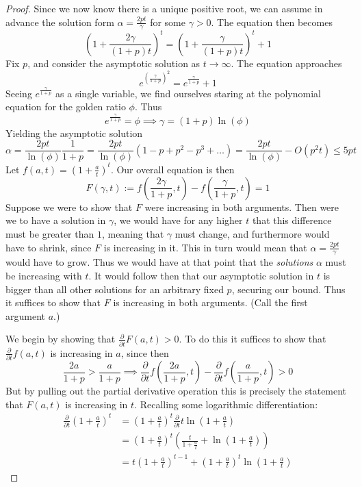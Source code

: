 \begin{proof}
Since we now know there is a unique positive root, we can assume in advance the solution form $\alpha = \frac{2pt}{\gamma}$ for some $\gamma > 0$. The equation then becomes 
\[ \left( 1+\frac{2\gamma}{(1+p)t} \right)^t = \left( 1+\frac{\gamma}{(1+p)t} \right)^t+1 \] 
Fix $p$, and consider the asymptotic solution as $t \to \infty$. The equation approaches
\[ e^{(\frac{\gamma}{1+p})^2} = e^{\frac{\gamma}{1+p}} + 1 \] 
Seeing $e^{\frac{\gamma}{1+p}}$ as a single variable, we find ourselves staring at the polynomial equation for the golden ratio $\phi$. Thus 
\[ e^{\frac{\gamma}{1+p}} = \phi \implies \gamma = (1+p)\ln(\phi) \]
Yielding the asymptotic solution
\[ \alpha = \frac{2pt}{\ln(\phi)}\frac{1}{1+p} = \frac{2pt}{\ln(\phi)}(1-p+p^2-p^3 + \ldots) = \frac{2pt}{\ln(\phi)} - O(p^2t) \leq 5pt \]
 Let $f(a,t) = \left( 1+\frac{a}{t} \right)^t$. Our overall equation is then
 \[ F(\gamma,t) := f(\frac{2\gamma}{1+p},t) - f(\frac{\gamma}{1+p},t) = 1 \]
Suppose we were to show that $F$ were increasing in both arguments. Then were we to have a solution in $\gamma$, we would have for any higher $t$ that this difference must be greater than $1$, meaning that $\gamma$ must change, and furthermore would have to shrink, since $F$ is increasing in it. This in turn would mean that $\alpha = \frac{2pt}{\gamma}$ would have to grow. Thus we would have at that point that the \emph{solutions} $\alpha$ must be increasing with $t$. It would follow then that our asymptotic solution in $t$ is bigger than all other solutions for an arbitrary fixed $p$, securing our bound. Thus it suffices to show that $F$ is increasing in both arguments. (Call the first argument $a$.) \par 
We begin by showing that $\frac{\partial}{\partial t}F(a,t) > 0$. To do this it suffices to show that $\frac{\partial}{\partial t} f(a,t)$ is increasing in $a$, since then 
\[ \frac{2a}{1+p} > \frac{a}{1+p} \implies \frac{\partial}{\partial t}f(\frac{2a}{1+p},t) - \frac{\partial}{\partial t}f(\frac{a}{1+p},t) > 0 \]
But by pulling out the partial derivative operation this is precisely the statement that $F(a,t)$ is increasing in $t$. Recalling some logarithmic differentiation:
\begin{align*}
	\frac{\partial}{\partial t}(1+\frac{a}{t})^t &= (1+\frac{a}{t})^t\frac{\partial}{\partial t}t\ln(1+\frac{a}{t}) \\
	&= (1+\frac{a}{t})^t(\frac{t}{1+\frac{a}{t}} + \ln(1+\frac{a}{t})) \\
	&= t(1+\frac{a}{t})^{t-1} + (1+\frac{a}{t})^t\ln(1+\frac{a}{t})
\end{align*} 

\end{proof}
